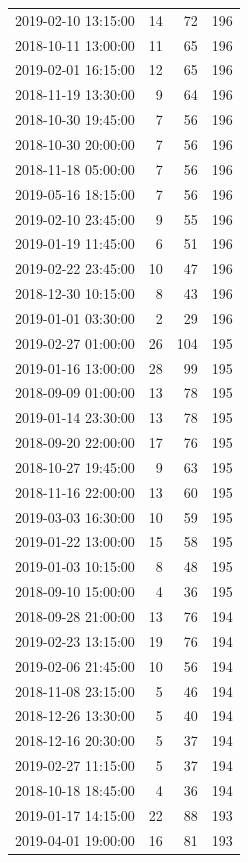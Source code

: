 \begin{tabular}{lrrr}
2019-02-10 13:15:00 & 14 & 72 & 196 \\
2018-10-11 13:00:00 & 11 & 65 & 196 \\
2019-02-01 16:15:00 & 12 & 65 & 196 \\
2018-11-19 13:30:00 & 9 & 64 & 196 \\
2018-10-30 19:45:00 & 7 & 56 & 196 \\
2018-10-30 20:00:00 & 7 & 56 & 196 \\
2018-11-18 05:00:00 & 7 & 56 & 196 \\
2019-05-16 18:15:00 & 7 & 56 & 196 \\
2019-02-10 23:45:00 & 9 & 55 & 196 \\
2019-01-19 11:45:00 & 6 & 51 & 196 \\
2019-02-22 23:45:00 & 10 & 47 & 196 \\
2018-12-30 10:15:00 & 8 & 43 & 196 \\
2019-01-01 03:30:00 & 2 & 29 & 196 \\
2019-02-27 01:00:00 & 26 & 104 & 195 \\
2019-01-16 13:00:00 & 28 & 99 & 195 \\
2018-09-09 01:00:00 & 13 & 78 & 195 \\
2019-01-14 23:30:00 & 13 & 78 & 195 \\
2018-09-20 22:00:00 & 17 & 76 & 195 \\
2018-10-27 19:45:00 & 9 & 63 & 195 \\
2018-11-16 22:00:00 & 13 & 60 & 195 \\
2019-03-03 16:30:00 & 10 & 59 & 195 \\
2019-01-22 13:00:00 & 15 & 58 & 195 \\
2019-01-03 10:15:00 & 8 & 48 & 195 \\
2018-09-10 15:00:00 & 4 & 36 & 195 \\
2018-09-28 21:00:00 & 13 & 76 & 194 \\
2019-02-23 13:15:00 & 19 & 76 & 194 \\
2019-02-06 21:45:00 & 10 & 56 & 194 \\
2018-11-08 23:15:00 & 5 & 46 & 194 \\
2018-12-26 13:30:00 & 5 & 40 & 194 \\
2018-12-16 20:30:00 & 5 & 37 & 194 \\
2019-02-27 11:15:00 & 5 & 37 & 194 \\
2018-10-18 18:45:00 & 4 & 36 & 194 \\
2019-01-17 14:15:00 & 22 & 88 & 193 \\
2019-04-01 19:00:00 & 16 & 81 & 193 \\

\end{tabular}
